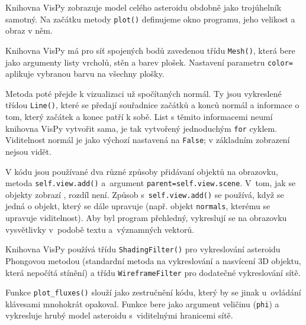 \documentclass[11pt]{article}
\newcommand{\jd}[1]{{\color{red} {#1}}}
\begin{document}
Knihovna VisPy zobrazuje model celého asteroidu obdobně jako trojúhelník samotný. Na začátku metody \verb|plot()| definujeme okno programu, jeho velikost a obraz v něm.



Knihovna VisPy má pro síť spojených bodů zavedenou třídu \verb|Mesh()|, která bere jako argumenty listy vrcholů, stěn a barev plošek. Nastavení parametru \verb|color=| aplikuje vybranou barvu na všechny plošky.



Metoda poté přejde k vizualizaci už spočítaných normál. Ty jsou vykreslené třídou \verb|Line()|, které se předají souřadnice začátků a konců normál a informace o tom, který začátek a konec patří k sobě. List s těmito informacemi neumí knihovna VisPy vytvořit sama, je tak vytvořený jednoduchým \verb|for| cyklem. Viditelnost normál je jako výchozí nastavená na \verb|False|; v základním zobrazení nejsou vidět.



V kódu jsou používané dva různé způsoby přidávaní objektů na obrazovku, metoda \verb|self.view.add()| a~argument \verb|parent=self.view.scene|. V~tom, jak se objekty zobrazí\jd{,} rozdíl není. Způsob s~\verb|self.view.add()| se používá, když se jedná o objekt, který se dále upravuje (např. objekt \verb|normals|, kterému se upravuje viditelnost). Aby byl program přehledný, vykreslují se na obrazovku vysvětlivky v~podobě textu a~významných vektorů. 



Knihovna VisPy používá třídu \verb|ShadingFilter()| pro vykreslování asteroidu Phongovou metodou (standardní metoda na vykreslování a nasvícení 3D objektu, která nepočítá stínění) a třídu \verb|WireframeFilter| pro dodatečné vykreslování sítě.



Funkce \verb|plot_fluxes()| slouží jako zestručnění kódu, který by se jinak u~ovládání klávesami mnohokrát opakoval. Funkce bere jako argument veličinu (\verb|phi|) a vykresluje hrubý model asteroidu s~viditelnými hranicemi sítě.
\end{document}
